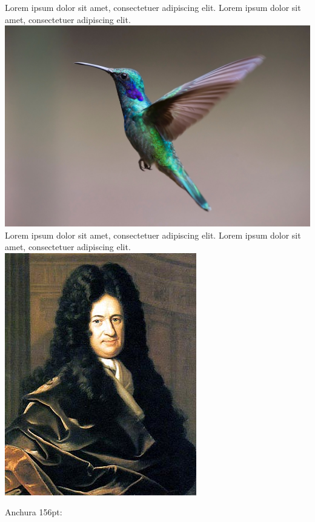 \documentclass[12pt,a4paper,twoside]{article}
\begin{document}
\noindent Lorem ipsum dolor sit amet, consectetuer adipiscing elit. Lorem ipsum dolor sit amet, consectetuer adipiscing elit.\\
\noindent\includegraphics[width=.4\textwidth]{images/bird.jpg}\\
\noindent Lorem ipsum dolor sit amet, consectetuer adipiscing elit. Lorem ipsum dolor sit amet, consectetuer adipiscing elit.\\
\noindent\includegraphics[width=.4\textwidth]{images/GWLeibniz.png}


%


Anchura 156pt:
\end{document}
